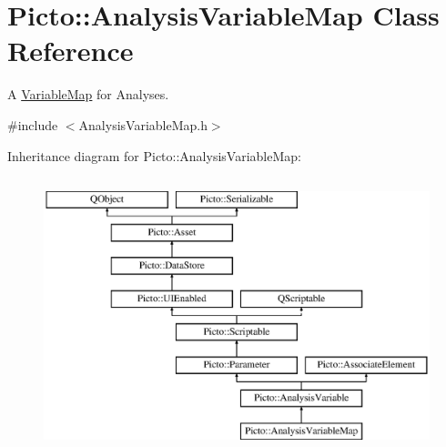 \hypertarget{class_picto_1_1_analysis_variable_map}{\section{Picto\-:\-:Analysis\-Variable\-Map Class Reference}
\label{class_picto_1_1_analysis_variable_map}
}


A \hyperlink{class_picto_1_1_variable_map}{Variable\-Map} for Analyses.  




{\ttfamily \#include $<$Analysis\-Variable\-Map.\-h$>$}

Inheritance diagram for Picto\-:\-:Analysis\-Variable\-Map\-:\begin{figure}[H]
\begin{center}
\leavevmode
\includegraphics[height=8.000000cm]{class_picto_1_1_analysis_variable_map}
\end{center}
\end{figure}
